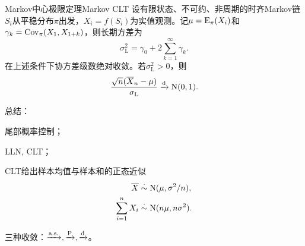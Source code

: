 \begin{theorem}{Markov中心极限定理}{Markov CLT}
	设有限状态、不可约、非周期的时齐Markov链$S_i$从平稳分布$\pi$出发，$X_i = f(S_i)$为实值观测。记$\mu = \operatorname{E}_\pi(X_i)$和$\gamma_k = \operatorname{Cov}_\pi(X_1,X_{1+k})$，则长期方差为
	\begin{equation}\label{eq:ps-long-run-variance}
		\sigma_{\mathrm L}^2 = \gamma_0 + 2\sum_{k=1}^\infty\gamma_k .
	\end{equation}
	在上述条件下协方差级数绝对收敛。若$\sigma_{\mathrm L}^2 > 0$，则
	\begin{equation}
		\label{eqn:Markov CLT}
		\frac{\sqrt n(\overline{X}_n - \mu)}{\sigma_{\mathrm L}} \xrightarrow{\mathrm d} \operatorname{N}(0,1).
	\end{equation}
\end{theorem}

\begin{remark}
	总结：
	\begin{compactenum}
		\item 尾部概率控制；
		\item LLN, CLT；
		\item CLT给出样本均值与样本和的正态近似
		\begin{align*}
			\overline{X} &\overset{\cdot}{\sim} \operatorname{N}(\mu,\sigma^2/n),\\
			\sum_{i=1}^nX_i &\overset{\cdot}{\sim} \operatorname{N}(n\mu,n\sigma^2).
		\end{align*}
		\item 三种收敛：$\xrightarrow{\text{a.s.}}, \xrightarrow{\operatorname{P}}, \xrightarrow{\mathrm d}$。
	\end{compactenum}
\end{remark}
